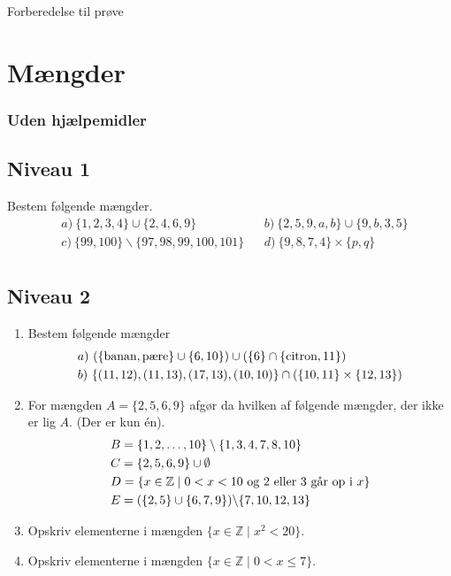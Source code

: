 \begin{center}
\Huge
Forberedelse til prøve
\end{center}

\section*{Mængder}

\subsubsection*{Uden hjælpemidler}

\subsection*{Niveau 1}

Bestem følgende mængder.
\begin{align*}
	&a) \  \{1,2,3,4\} \cup \{2,4,6,9\}     &&b)  \  \{2,5,9,a,b\} \cup \{9,b,3,5\}    \\
	&c) \  \{99,100\} \backslash \{97,98,99,100,101\}     &&d)  \  \{9,8,7,4\} \times \{p,q\}    \\	
\end{align*}

\subsection*{Niveau 2}
\begin{enumerate}[label=\roman*)]
	\item Bestem følgende mængder
	\begin{align*}
		&a) \  (\{\textnormal{banan},\textnormal{pære}\} \cup \{6,10\}) \cup (\{6\} \cap \{\textnormal{citron},11\})   \\ 
		&b)  \  \{(11,12),(11,13),(17,13),(10,10)\} \cap (\{10,11\} \times \{12,13\})    \\
	\end{align*}
	
	\item For mængden $A = \{2,5,6,9\}$ afgør da hvilken af følgende mængder, der ikke er lig $A$. (Der er kun én).
	\begin{align*}
		&B = \{1,2,\hdots,10\} \setminus \{1,3,4,7,8,10\}\\
		&C = \{2,5,6,9\} \cup \emptyset \\
		&D = \{x \in \mathbb{Z} \mid 0 < x < 10 \textnormal{ og 2 eller 3 går op i }x \} \\
		&E = (\{2,5\} \cup \{6,7,9\}) \backslash \{7,10,12,13\} 
	\end{align*}	 
	\item Opskriv elementerne i mængden $\{x \in \mathbb{Z} \mid x^2 < 20 \}$.
	\item Opskriv elementerne i mængden $\{x \in \mathbb{Z} \mid 0 < x \leq 7 \} $.
\end{enumerate}

